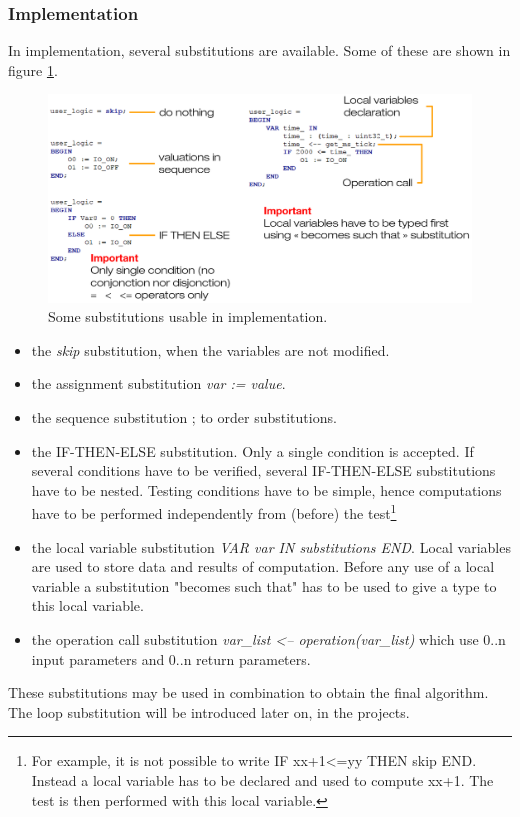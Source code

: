 \subsubsection{Implementation}

In implementation, several substitutions are available. Some of these are shown in figure \ref{programming:subst-implem}.

\begin{figure}[ht]
\centering\includegraphics[scale=0.30]{Pictures/chapterProgramming/subst-implem.png}
\caption{Some substitutions usable in implementation. }
\label{programming:subst-implem}
\end{figure}  

\begin{itemize}
    \item the \textit{skip} substitution, when the variables are not modified.
    \item the assignment substitution \textit{var := value}.
    \item the sequence substitution ; to order substitutions.
    \item the IF-THEN-ELSE substitution. Only a single condition is accepted. If several conditions have to be verified, several IF-THEN-ELSE substitutions have to be nested. Testing conditions have to be simple, hence computations have to be performed independently from (before) the test\footnote{For example, it is not possible to write IF xx+1<=yy THEN skip END. Instead a local variable has to be declared and used to compute xx+1. The test is then performed with this local variable.}
    \item the local variable substitution \textit{VAR var IN substitutions END}. Local variables are used to store data and results of computation. Before any use of a local variable a substitution "becomes such that" has to be used to give a type to this local variable.
    \item the operation call substitution \textit{var\_list <-- operation(var\_list)} which use 0..n input parameters and 0..n return parameters.
\end{itemize}
These substitutions may be used in combination to obtain the final algorithm. The loop substitution will be introduced later on, in the projects.

